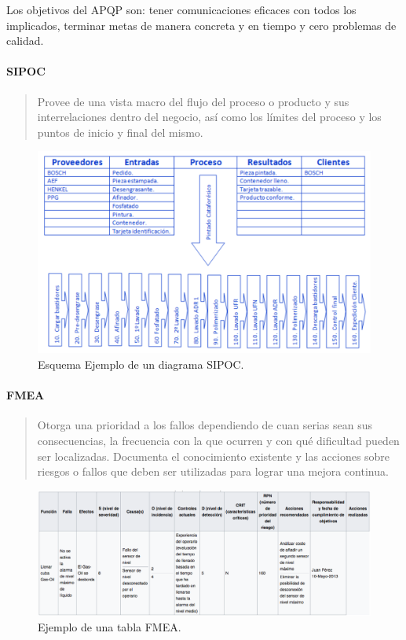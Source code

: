 \documentclass[oneside]{book}
\begin{document}
Los objetivos del APQP son: tener comunicaciones eficaces con todos los implicados, terminar metas de manera concreta y en tiempo y cero problemas de calidad.

\paragraph{SIPOC}
\begin{quote}
	Provee de una vista macro del flujo del proceso o producto y sus interrelaciones dentro del negocio, así como los límites del proceso y los puntos de inicio y final del mismo.
\end{quote}

\begin{figure}[H]
	\centering
	\includegraphics[width=130mm]{imagenes/EjemploSIPOC.png}
	\caption{Esquema Ejemplo de un diagrama SIPOC.}
	\label{fig:EjemploSIPOC}
\end{figure}

\paragraph{FMEA}
\begin{quote}
	Otorga una prioridad a los fallos dependiendo de cuan serias sean sus consecuencias, la frecuencia con la que ocurren y con qué dificultad pueden ser localizadas. Documenta el conocimiento existente y las acciones sobre riesgos o fallos que deben ser utilizadas para lograr una mejora continua. 
\end{quote}

\begin{figure}[H]
	\centering
	\includegraphics[width=180mm]{imagenes/EjemploFMEA.png}
	\caption{Ejemplo de una tabla FMEA.}
	\label{fig:EjemploFMEA}
\end{figure}
\end{document}
